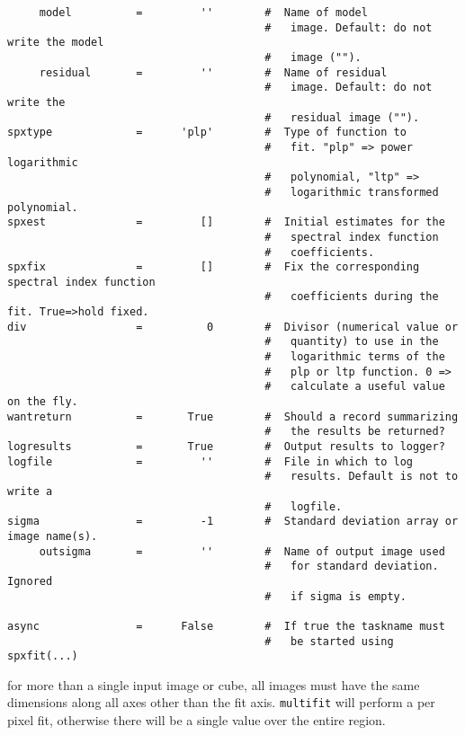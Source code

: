 \begin{verbatim}
     model          =         ''        #  Name of model
                                        #   image. Default: do not write the model
                                        #   image ("").
     residual       =         ''        #  Name of residual
                                        #   image. Default: do not write the
                                        #   residual image ("").
spxtype             =      'plp'        #  Type of function to
                                        #   fit. "plp" => power logarithmic
                                        #   polynomial, "ltp" =>
                                        #   logarithmic transformed polynomial.
spxest              =         []        #  Initial estimates for the
                                        #   spectral index function
                                        #   coefficients.
spxfix              =         []        #  Fix the corresponding spectral index function
                                        #   coefficients during the fit. True=>hold fixed.
div                 =          0        #  Divisor (numerical value or
                                        #   quantity) to use in the
                                        #   logarithmic terms of the
                                        #   plp or ltp function. 0 =>
                                        #   calculate a useful value on the fly.
wantreturn          =       True        #  Should a record summarizing
                                        #   the results be returned? 
logresults          =       True        #  Output results to logger?
logfile             =         ''        #  File in which to log
                                        #   results. Default is not to write a
                                        #   logfile.
sigma               =         -1        #  Standard deviation array or image name(s).
     outsigma       =         ''        #  Name of output image used
                                        #   for standard deviation. Ignored
                                        #   if sigma is empty.

async               =      False        #  If true the taskname must
                                        #   be started using spxfit(...)
\end{verbatim}
\normalsize

for more than a single input image or cube, all images must have the
same dimensions along all axes other than the fit axis. {\tt multifit}
will perform a per pixel fit, otherwise there will be a single value
over the entire region.

